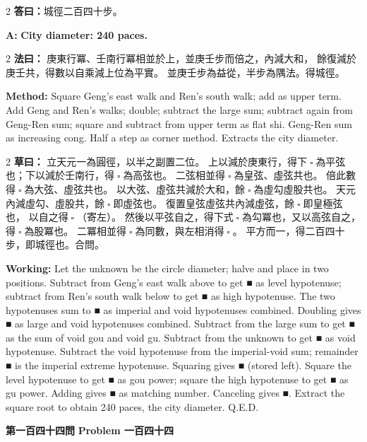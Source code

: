 \documentclass[11pt,a4paper]{article}
\let\origsquare\square
\renewcommand{\square}{\ensuremath{\origsquare}}%
\newcommand{\wen}[1]{%
  \par\vspace{0.5em}%
  \noindent\textcolor{problemcolor}{\textbf{第#1問}}%
  \hfill\textcolor{problemcolor}{\textbf{Problem #1}}\par\nopagebreak%
  \vspace{0.3em}%
}
\newcommand{\fayue}[1]{%
  \noindent\textcolor{methodcolor}{\textbf{法曰：}}{\tradfont #1}\par\nopagebreak%
}
\newcommand{\fayueeng}[1]{%
  \noindent\textcolor{engcolor}{\textbf{Method: }}{#1}\par\nopagebreak%
}
\newcommand{\tsaoyue}[1]{%
  \noindent\textcolor{workcolor}{\textbf{草曰：}}{\tradfont #1}\par%
}
\newcommand{\tsaoyueeng}[1]{%
  \noindent\textcolor{engcolor}{\textbf{Working: }}{\small #1}\par%
}
\newcommand{\dayue}[1]{%
  \noindent\textcolor{anscolor}{\textbf{答曰：}}{\tradfont #1}\par\nopagebreak%
}
\newcommand{\dayueeng}[1]{%
  \noindent\textcolor{engcolor}{\textbf{A: }}{\bfseries #1}\par\nopagebreak%
}
\begin{document}
\begin{paracol}{2}
\dayue{城徑二百四十步。}
\switchcolumn
\dayueeng{City diameter: 240 paces.}
\end{paracol}

\begin{paracol}{2}
\fayue{%
庚東行冪、壬南行冪相並於上，並庚壬步而倍之，內減大和，
餘復減於庚壬共，得數以自乘減上位為平實。
並庚壬步為益從，半步為隅法。得城徑。}
\switchcolumn
\fayueeng{%
Square Geng's east walk and Ren's south walk; add as upper term. Add Geng and Ren's walks; double; subtract the large sum; subtract again from Geng-Ren sum; square and subtract from upper term as flat shi. Geng-Ren sum as increasing cong. Half a step as corner method. Extracts the city diameter.}
\end{paracol}

\begin{paracol}{2}
\tsaoyue{%
立天元一為圓徑，以半之副置二位。
上以減於庚東行，得下$ \; \square \; $為平弦也；下以減於壬南行，得$ \; \square \; $為高弦也。
二弦相並得$ \; \square \; $為皇弦、虛弦共也。
倍此數得$ \; \square \; $為大弦、虛弦共也。
以大弦、虛弦共減於大和，餘$ \; \square \; $為虛勾虛股共也。
天元內減虛勾、虛股共，餘$ \; \square \; $即虛弦也。
復置皇弦虛弦共內減虛弦，餘$ \; \square \; $即皇極弦也，
以自之得$ \; \square \; $（寄左）。
然後以平弦自之，得下式$ \; \square \; $為勾冪也，又以高弦自之，
得$ \; \square \; $為股冪也。
二冪相並得$ \; \square \; $為同數，與左相消得$ \; \square \; $。
平方而一，得二百四十步，即城徑也。合問。}
\switchcolumn
\tsaoyueeng{%
Let the unknown be the circle diameter; halve and place in two positions. Subtract from Geng's east walk above to get ■ as level hypotenuse; subtract from Ren's south walk below to get ■ as high hypotenuse. The two hypotenuses sum to ■ as imperial and void hypotenuses combined. Doubling gives ■ as large and void hypotenuses combined. Subtract from the large sum to get ■ as the sum of void gou and void gu. Subtract from the unknown to get ■ as void hypotenuse. Subtract the void hypotenuse from the imperial-void sum; remainder ■ is the imperial extreme hypotenuse. Squaring gives ■ (stored left). Square the level hypotenuse to get ■ as gou power; square the high hypotenuse to get ■ as gu power. Adding gives ■ as matching number. Canceling gives ■. Extract the square root to obtain 240 paces, the city diameter. Q.E.D.}
\end{paracol}

\vspace{0.5cm}

\wen{一百四十四}
\end{document}
